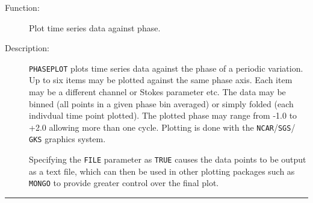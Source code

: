 \documentclass[11pt,twoside]{article}
\renewcommand{\_}{\texttt{\symbol{95}}}
\newcommand{\manrule}{\rule{\textwidth}{0.5mm}}
\newenvironment{manroutinedescription}{\begin{description}}{\end{description}%
\manrule}
\newcommand{\manroutineitem}[2]{\item[#1:] #2\mbox{}}
\newcommand{\mantt}{\tt}
\begin{document}
\begin{manroutinedescription}
\manroutineitem{Function}{}
        Plot time series data against phase.

\manroutineitem{Description}{}
        {\mantt{PHASEPLOT}} plots time series data against the phase of a %
periodic
        variation. Up to six items may be plotted against the same phase
        axis. Each item may be a different channel or Stokes parameter etc.
        The data may be binned (all points in a given phase bin averaged)
        or simply folded (each indivdual time point plotted). The
        plotted phase may range from -1.0 to +2.0 allowing more than
        one cycle. Plotting is done with the {\mantt{NCAR}}/{\mantt{SGS}}/{%
\mantt{GKS}} graphics system.

        Specifying the {\mantt{FILE}} parameter as {\mantt{TRUE}} causes the %
data points
        to be output as a text file, which can then be used in other
        plotting packages such as {\mantt{MONGO}} to provide greater control %
over
        the final plot.


\end{manroutinedescription}
\end{document}
